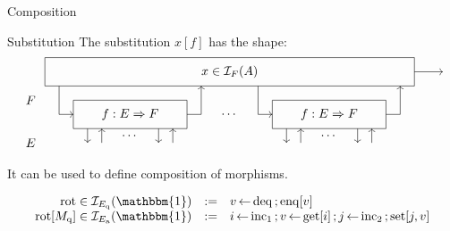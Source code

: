 \documentclass[aspectratio=54]{beamer}
\newcommand{\kw}[1]{\ensuremath{ \mathrm{#1} }}
\begin{document}
\begin{frame}{Composition} %
  \begin{block}{Substitution}
    The substitution $x[f]$ has the shape:
    \[
    \begin{tikzpicture}[scale=0.4]
      \draw[->] (13, 3) -- (15, 3);
      \draw (-13, 2) rectangle (13, 4);
      \node at (0, 3) {$x \in \mathcal{I}_F(A)$};
      \begin{scope}[xshift=-7cm]
        \draw (-4,-1) rectangle (4,1);
        \draw[->] (-5, 2) |- (-4,0);
        \draw[->] (4,0) -| (5,2);
        \node (f) at (0,0) {$f : E \Rightarrow F$};
        \draw[->] (-3, -1) -- (-3, -2);
        \draw[->] (-2, -2) -- (-2, -1);
        \node[below] at (0, -1) {$\cdots$};
        \draw[->] (2, -1) -- (2, -2);
        \draw[->] (3, -2) -- (3, -1);
      \end{scope}
      \node at (0, 0) {$\cdots$};
      \begin{scope}[xshift=7cm]
        \draw (-4,-1) rectangle (4,1);
        \draw[->] (-5, 2) |- (-4,0);
        \draw[->] (4,0) -| (5,2);
        \node (f) at (0,0) {$f : E \Rightarrow F$};
        \draw[->] (-3, -1) -- (-3, -2);
        \draw[->] (-2, -2) -- (-2, -1);
        \node[below] at (0, -1) {$\cdots$};
        \draw[->] (2, -1) -- (2, -2);
        \draw[->] (3, -2) -- (3, -1);
      \end{scope}
      \node at (-14,  1) {$F$};
      \node at (-14, -2) {$E$};
    \end{tikzpicture}
    \]
    It can be used to define composition of morphisms.
  \end{block}
  \pause
  \begin{example}
    \vspace{-1em}
    \[ \begin{array}{r@{{} \in {}}c@{\quad := \quad}l}
      \kw{rot} & \mathcal{I}_{E_\kw{q}}(\mathbbm{1}) &
        v \mathop{\leftarrow} \kw{deq} \mathop{;} \kw{enq}[v] \\
      \kw{rot}[M_\kw{q}] & \mathcal{I}_{E_\kw{a}}(\mathbbm{1}) &
        i \mathop{\leftarrow} \kw{inc}_1 \mathop{;}
        v \mathop{\leftarrow} \kw{get}[i] \mathop{;}
        j \mathop{\leftarrow} \kw{inc}_2 \mathop{;}
        \kw{set}[j, v]
    \end{array} \]
  \end{example}
\end{frame}
\end{document}
